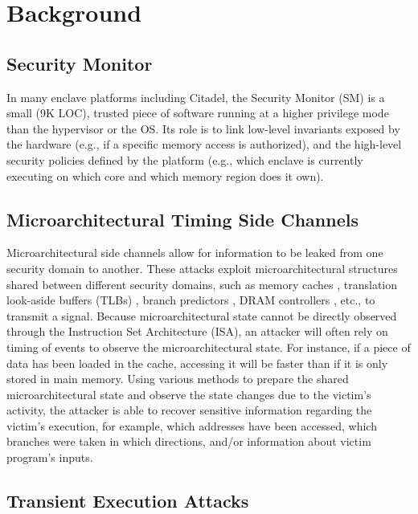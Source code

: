 \section{Background}

\subsection{Security Monitor}
In many enclave platforms including Citadel, the Security Monitor (SM) \cite{costan2016sanctum} \cite{lebedev2019sanctorum} is a small (9K LOC), trusted piece of software running at a higher privilege mode than the hypervisor or the OS.
Its role is to link low-level invariants exposed by the hardware (e.g., if a specific memory access is authorized), and the high-level security policies defined by the platform (e.g., which enclave is currently executing on which core and which memory region does it own).


\subsection{Microarchitectural Timing Side Channels}
Microarchitectural side channels allow for information to be leaked from one security domain to another.
These attacks exploit microarchitectural structures shared between different security domains, such as memory caches \cite{gotzfried2017cache, brasser2017software}, translation look-aside buffers (TLBs) \cite{gras2018translation}, branch predictors \cite{evtyushkin2018branchscope, aciiccmez2006predicting}, DRAM controllers \cite{wang2014timing}, etc., to transmit a signal.
Because microarchitectural state cannot be directly observed through the Instruction Set Architecture (ISA), an attacker will often rely on timing of events to observe the microarchitectural state.
For instance, if a piece of data has been loaded in the cache, accessing it will be faster than if it is only stored in main memory.
Using various methods to prepare the shared microarchitectural state and observe the state changes due to the victim's activity, the attacker is able to recover sensitive information regarding the victim's execution, for example, which addresses have been accessed, which branches were taken in which directions, and/or information about victim program's inputs.


\subsection{Transient Execution Attacks}
\label{sec:specandside}

